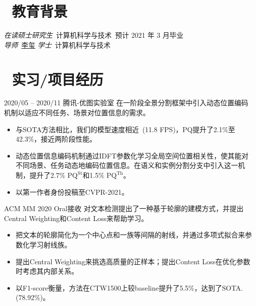 \documentclass{resume}
\begin{document}
	
	
	
	\section{\faGraduationCap\  教育背景}
	\textit{在读硕士研究生}\ 计算机科学与技术\ 预计 2021 年 3 月毕业\\
	\textit{导师}\ \href{https://person.zju.edu.cn/xilics}{李玺} 
	\vspace{-0.25em}
	\textit{学士}\ 计算机科学与技术
	\vspace{-0.5em}
	
	\section{\faUsers\ 实习/项目经历}
	 {2020/05 -- 2020/11}
	 {腾讯-优图实验室}
	在一阶段全景分割框架中引入动态位置编码机制以适应不同任务、场景对位置信息的需求。
	\vspace{-0.2em}
	\begin{itemize}
		\item 与SOTA方法相比，我们的模型速度相近~(11.8 FPS)，PQ提升了2.1\%至42.3\%，接近两阶段性能。
		\item 动态位置信息编码机制通过IDFT参数化学习全局空间位置相关性，使其能对不同场景、任务动态地编码位置信息。在语义和实例分割分支中引入这一机制，提升了2.7\% $\text{PQ}^\text{St}$和1.5\% $\text{PQ}^\text{Th}$。
		\item 以第一作者身份投稿至CVPR-2021。
	\end{itemize}

	
	\role{研究} {ACM MM 2020 Oral接收}
	对文本检测提出了一种基于轮廓的建模方式，并提出Central Weighting和Content Loss来帮助学习。
	\vspace{-0.2em}
	\begin{itemize}
		\item 把文本的轮廓简化为一个中心点和一族等间隔的射线，并通过多项式拟合来参数化学习射线族。
		\item 提出Central Weighting来挑选高质量的正样本；提出Content Loss在优化参数时考虑其内部关系。
		\item 以F1-score衡量，方法在CTW1500上较baseline提升了5.5\%，达到了SOTA.(78.92\%)。
	\end{itemize}
	\vspace{-0.25em}
	
\end{document}
